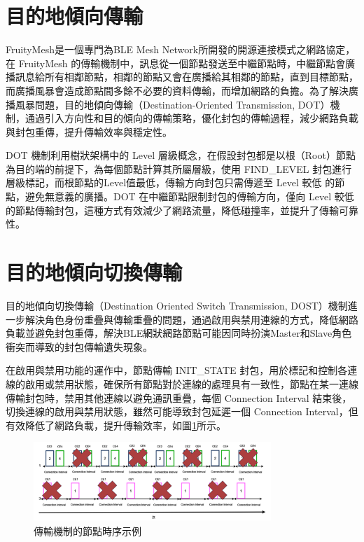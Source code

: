 \begin{ZhChapter}
\section{目的地傾向傳輸}

FruityMesh是一個專門為BLE Mesh Network所開發的開源連接模式之網路協定，在 FruityMesh 的傳輸機制中，訊息從一個節點發送至中繼節點時，中繼節點會廣播訊息給所有相鄰節點，相鄰的節點又會在廣播給其相鄰的節點，直到目標節點，而廣播風暴會造成節點間多餘不必要的資料傳輸，而增加網路的負擔。為了解決廣播風暴問題，目的地傾向傳輸（Destination-Oriented Transmission, DOT）\cite{112TIT00392032}機制，通過引入方向性和目的傾向的傳輸策略，優化封包的傳輸過程，減少網路負載與封包重傳，提升傳輸效率與穩定性。

DOT 機制利用樹狀架構中的 Level 層級概念，在假設封包都是以根（Root）節點為目的端的前提下，為每個節點計算其所屬層級，使用 FIND\_LEVEL 封包進行層級標記，而根節點的Level值最低，傳輸方向封包只需傳遞至 Level 較低 的節點，避免無意義的廣播。DOT 在中繼節點限制封包的傳輸方向，僅向 Level 較低的節點傳輸封包，這種方式有效減少了網路流量，降低碰撞率，並提升了傳輸可靠性。

\section{目的地傾向切換傳輸}

目的地傾向切換傳輸（Destination Oriented Switch Transmission, DOST）\cite{112TIT00392032}機制進一步解決角色身份重疊與傳輸重疊的問題，通過啟用與禁用連線的方式，降低網路負載並避免封包重傳，解決BLE網狀網路節點可能因同時扮演Master和Slave角色衝突而導致的封包傳輸遺失現象。

在啟用與禁用功能的運作中，節點傳輸 INIT\_STATE 封包，用於標記和控制各連線的啟用或禁用狀態，確保所有節點對於連線的處理具有一致性，節點在某一連線傳輸封包時，禁用其他連線以避免通訊重疊，每個 Connection Interval 結束後，切換連線的啟用與禁用狀態，雖然可能導致封包延遲一個 Connection Interval，但有效降低了網路負載，提升傳輸效率，如圖\ref{fig: 傳輸機制的節點時序示例}所示。

\begin{figure}[H]
    \centering
    \includegraphics[width = 0.8\textwidth]{image/傳輸機制的節點時序示例.png}
    \caption{傳輸機制的節點時序示例\cite{112TIT00392032}}
    \label{fig: 傳輸機制的節點時序示例}
\end{figure}


\end{ZhChapter}
